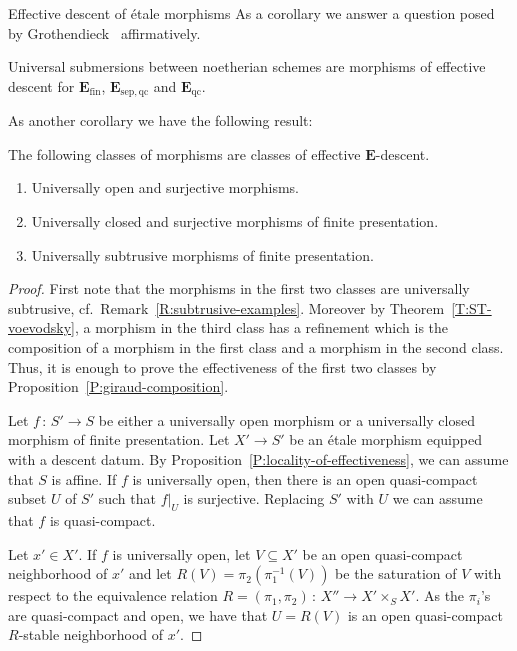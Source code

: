 \documentclass[a4paper,twoside,11pt]{amsart}[2009/07/02] %
\newcommand{\pref}[1]{\eqref{#1}}
\newcommand{\map}[3]{#1\,:\, #2\rightarrow #3}
\newcommand{\etale}{\'{e}tale}
\newcommand{\sep}{\mathrm{sep}}
\newcommand{\catE}{\mathbf{E}}
\newcommand{\qc}{\mathrm{qc}}
\newcommand{\finite}{\mathrm{fin}}
\begin{document}
\begin{section}{Effective descent of \etale{} morphisms}
As a corollary we answer a question posed by
Grothendieck~\cite[Exp.~IX, Comment after Cor.~3.3]{sga1} affirmatively.

\begin{corollary}
Universal submersions between noetherian schemes are morphisms of effective
descent for $\catE_{\finite}$, $\catE_{\sep,\qc}$ and $\catE_{\qc}$.
\end{corollary}

As another corollary we have the following result:

\begin{theorem}\label{T:descent-for-et}
The following classes of morphisms are classes of effective $\catE$-descent.
\begin{enumerate}
\item Universally open and surjective morphisms.
\item Universally closed and surjective morphisms of finite presentation.
\item Universally subtrusive morphisms of finite presentation.
\end{enumerate}
\end{theorem}
\begin{proof}
First note that the morphisms in the first two classes are universally
subtrusive, cf.\ Remark~\pref{R:subtrusive-examples}. Moreover by
Theorem~\pref{T:ST-voevodsky}, a morphism in the third class has a refinement
which is the composition of a morphism in the first class and a morphism in the
second class. Thus, it is enough to prove the effectiveness of the first two
classes by Proposition~\pref{P:giraud-composition}.

Let $\map{f}{S'}{S}$ be
either a universally open morphism or a universally closed morphism of finite
presentation. Let $X'\to S'$ be an \etale{} morphism equipped with a descent
datum. By Proposition~\pref{P:locality-of-effectiveness}, we can assume that
$S$ is affine. If $f$ is universally open, then there is an open quasi-compact
subset $U$ of $S'$ such that $f|_U$ is surjective. Replacing $S'$ with $U$ we
can assume that $f$ is quasi-compact.

Let $x'\in X'$. If $f$ is universally open, let $V\subseteq X'$ be an open
quasi-compact neighborhood of $x'$ and let $R(V)=\pi_2(\pi_1^{-1}(V))$ be the
saturation of $V$ with respect to the equivalence relation
$\map{R=(\pi_1,\pi_2)}{X''}{X'\times_S X'}$. As the $\pi_i$'s are quasi-compact
and open, we have that $U=R(V)$ is an open quasi-compact $R$-stable
neighborhood of $x'$.


\end{proof}
\end{section}
\end{document}
